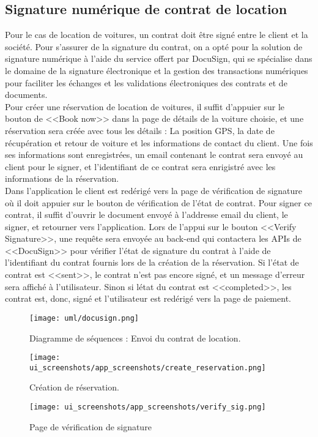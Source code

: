 \subsection{Signature numérique de contrat de location}
Pour le cas de location de voitures, un contrat doit être signé entre le client et la société. Pour s'assurer de la signature du contrat, on a opté pour la solution de signature numérique à l'aide du service offert par DocuSign, qui se spécialise dans le domaine de la signature électronique et la gestion des transactions numériques pour faciliter les échanges et les validations électroniques des contrats et de documents.\\
\noindent Pour créer une réservation de location de voitures, il suffit d'appuier sur le bouton de <<Book now>> dans la page de détails de la voiture choisie, et une réservation sera créée avec tous les détails : La position GPS, la date de récupération et retour de voiture et les informations de contact du client. Une fois ses informations sont enregistrées, un email contenant le contrat sera envoyé au client pour le signer, et l'identifiant de ce contrat sera enrigistré avec les informations de la réservation.\\
\noindent Dans l'application le client est redérigé vers la page de vérification de signature où il doit appuier sur le bouton de vérification de l'état de contrat. Pour signer ce contrat, il suffit d'ouvrir le document envoyé à l'addresse email du client, le signer, et retourner vers l'application. Lors de l'appui sur le bouton <<Verify Signature>>, une requête sera envoyée au back-end qui contactera les APIs de <<DocuSign>> pour vérifier l'état de signature du contrat à l'aide de l'identifiant du contrat fournis lors de la création de la réservation. Si l'état de contrat est <<sent>>, le contrat n'est pas encore signé, et un message d'erreur sera affiché à l'utilisateur. Sinon si létat du contrat est <<completed>>, les contrat est, donc, signé et l'utilisateur est redérigé vers la page de paiement.
\vspace{1cm}
\begin{figure}[H]
    \centering
    \texttt{[image: uml/docusign.png]}
    \captionsetup{justification=centering}
    \caption{Diagramme de séquences : Envoi du contrat de location.}
    \label{fig:seq_location_contract}
\end{figure}
\vspace{1cm}
\begin{multicols}{2}
    \begin{figure}[H]
        \centering
        \texttt{[image: ui\_screenshots/app\_screenshots/create\_reservation.png]}
        \captionsetup{justification=centering}
        \caption{Création de réservation.}
        \label{fig:create_res}
    \end{figure}
    \begin{figure}[H]
        \centering
        \texttt{[image: ui\_screenshots/app\_screenshots/verify\_sig.png]}
        \captionsetup{justification=centering}
        \caption{Page de vérification de signature}
        \label{fig:verify_sig}
    \end{figure}
\end{multicols}
